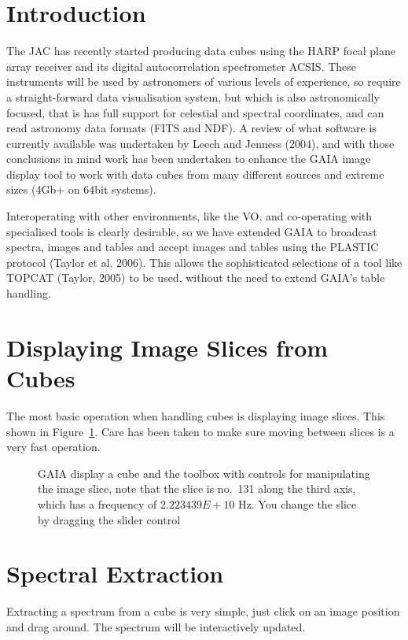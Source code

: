 \documentclass[11pt,twoside]{article}  %
\begin{document}
\section{Introduction}

The JAC has recently started producing data cubes using the HARP focal plane
array receiver and its digital autocorrelation spectrometer ACSIS. These
instruments will be used by astronomers of various levels of experience, so
require a straight-forward data visualisation system, but which is also
astronomically focused, that is has full support for celestial and spectral
coordinates, and can read astronomy data formats (FITS and NDF). A review of
what software is currently available was undertaken by Leech and Jenness
(2004), and with those conclusions in mind work has been undertaken to enhance
the GAIA image display tool to work with data cubes from many different
sources and extreme sizes (4Gb+ on 64bit systems).

Interoperating with other environments, like the VO, and co-operating with
specialised tools is clearly desirable, so we have extended GAIA to broadcast
spectra, images and tables and accept images and tables using the PLASTIC
protocol (Taylor et al. 2006).  This allows the sophisticated selections of a
tool like TOPCAT (Taylor, 2005) to be used, without the need to extend GAIA's
table handling.

\section{Displaying Image Slices from Cubes}

The most basic operation when handling cubes is displaying image slices. This
shown in Figure~\ref{D1.1-fig1}. Care has been taken to make sure moving
between slices is a very fast operation.

\begin{figure}
\caption{GAIA display a cube and the toolbox with controls for manipulating
the image slice, note that the slice is no.\ 131 along the third axis, which
has a frequency of $2.223439E+10$ Hz. You change the slice by dragging the
slider control}
\label{D1.1-fig1}
\end{figure}

\section{Spectral Extraction}

Extracting a spectrum from a cube is very simple, just click on an image
position and drag around. The spectrum will be interactively updated.
\end{document}
